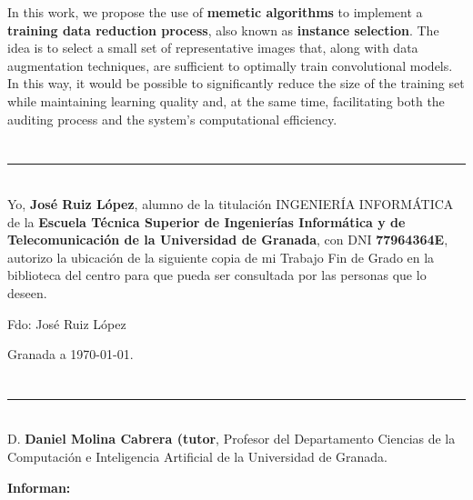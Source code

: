 In this work, we propose the use of \textbf{memetic algorithms} to implement a \textbf{training data reduction process}, 
also known as \textbf{instance selection}.
The idea is to select a small set of representative images that, along with data augmentation techniques, 
are sufficient to optimally train convolutional models.
In this way, it would be possible to significantly reduce the size of the training set while maintaining learning quality and, 
at the same time, facilitating both the auditing process and the system's computational efficiency.

\chapter*{}
\thispagestyle{empty}

\noindent\rule[-1ex]{\textwidth}{2pt}\\[4.5ex]

Yo, \textbf{José Ruiz López}, alumno de la titulación INGENIERÍA INFORMÁTICA de la \textbf{Escuela Técnica Superior
       de Ingenierías Informática y de Telecomunicación de la Universidad de Granada}, con DNI \textbf{77964364E}, autorizo la
ubicación de la siguiente copia de mi Trabajo Fin de Grado en la biblioteca del centro para que pueda ser
consultada por las personas que lo deseen.

\vspace{6cm}

\noindent Fdo: José Ruiz López

\vspace{2cm}

\begin{flushright}
       Granada a \today.
\end{flushright}


\chapter*{}
\thispagestyle{empty}

\noindent\rule[-1ex]{\textwidth}{2pt}\\[4.5ex]

D. \textbf{Daniel Molina Cabrera (tutor}, Profesor del Departamento Ciencias de la Computación e Inteligencia
Artificial de la Universidad de Granada.

\vspace{0.5cm}

\textbf{Informan:}

\vspace{0.5cm}

